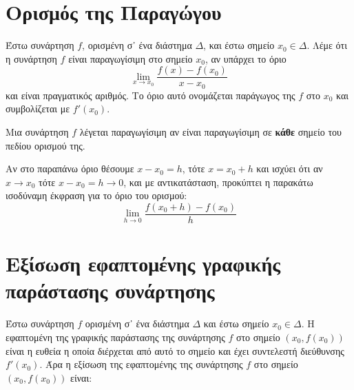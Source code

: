\section*{Ορισμός της Παραγώγου}

\begin{dfn}
  Έστω συνάρτηση $ f $, ορισμένη σ᾽ ένα διάστημα $\Delta$, και έστω σημείο $ x_{0} \in
  \Delta $. Λέμε ότι η συνάρτηση $f$ είναι \textcolor{Col1}{παραγωγίσιμη στο σημείο 
  $ x_{0} $}, αν υπάρχει το όριο
  \[
    \lim_{x \to x_{0}} \frac{f(x)-f(x_{0})}{x- x_{0}} 
  \] 
  και είναι πραγματικός αριθμός. Το όριο αυτό ονομάζεται παράγωγος της $f$ στο $ x_{0} $ 
  και συμβολίζεται με $ f'(x_{0}) $.
\end{dfn}

\begin{dfn}  
  Μια συνάρτηση $ f $ λέγεται \textcolor{Col1}{παραγωγίσιμη} αν είναι παραγωγίσιμη σε 
  \textbf{κάθε} σημείο του πεδίου ορισμού της.
\end{dfn}

\begin{rem}
  Αν στο παραπάνω όριο θέσουμε $x-x_{0}=h $, τότε $ x=x_{0}+h $ και ισχύει ότι
αν $ x \to x_{0} $ τότε $ x- x_{0} = h \to 0$, και με αντικατάσταση, προκύπτει η 
παρακάτω ισοδύναμη έκφραση για το όριο του ορισμού:
  \[
    \lim_{h \to 0} \frac{f(x_{0}+h)-f(x_{0})}{h} 
  \]
\end{rem}

\section*{Εξίσωση εφαπτομένης γραφικής παράστασης συνάρτησης}

Έστω συνάρτηση $ f $ ορισμένη σ᾽ ένα διάστημα $\Delta$ και έστω σημείο 
$ x_{0} \in \Delta $. Η \textcolor{Col1}{εφαπτομένη} της γραφικής παράστασης της 
συνάρτησης $ f $ στο σημείο $ (x_{0}, f(x_{0})) $ είναι η ευθεία η οποία διέρχεται από 
αυτό το σημείο και έχει συντελεστή διεύθυνσης $ f'(x_{0}) $. Άρα η εξίσωση της 
εφαπτομένης της συνάρτησης $f$ στο σημείο $ (x_{0}, f(x_{0})) $ είναι:

\vspace{\baselineskip}

